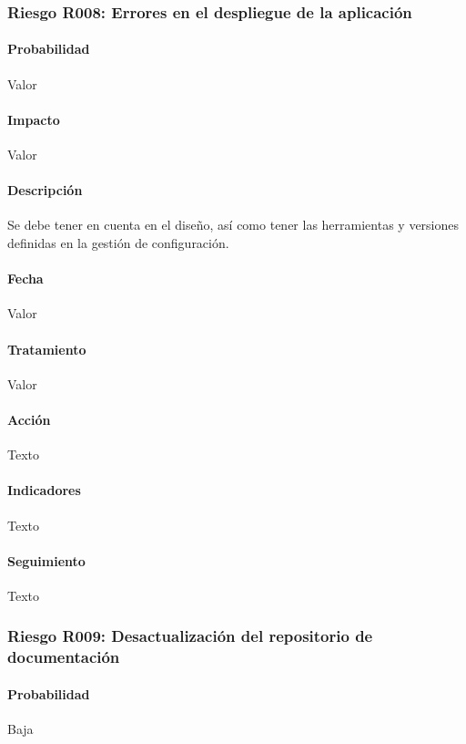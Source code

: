 \documentclass[10pt,a4paper]{article}
\begin{document}
				\subsubsection{Riesgo R008: Errores en el despliegue de la aplicación}
				\paragraph{Probabilidad} Valor
				\paragraph{Impacto}	Valor
				\paragraph{Descripción} Se debe tener en cuenta en el diseño, así como tener las herramientas y versiones definidas en la gestión de configuración.
				\paragraph{Fecha} Valor %
				\paragraph{Tratamiento} Valor %
				\paragraph{Acción} Texto %
				\paragraph{Indicadores} Texto %
				\paragraph{Seguimiento}	Texto %
								
				\subsubsection{Riesgo R009: Desactualización del repositorio de documentación}
				\paragraph{Probabilidad} Baja
\end{document}
